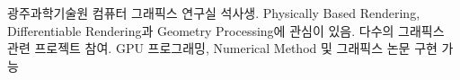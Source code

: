 %
%
%
\par{
광주과학기술원 컴퓨터 그래픽스 연구실 석사생. Physically Based Rendering, Differentiable Rendering과 Geometry Processing에 관심이 있음. 다수의 그래픽스 관련 프로젝트 참여. GPU 프로그래밍, Numerical Method 및 그래픽스 논문 구현 가능
}